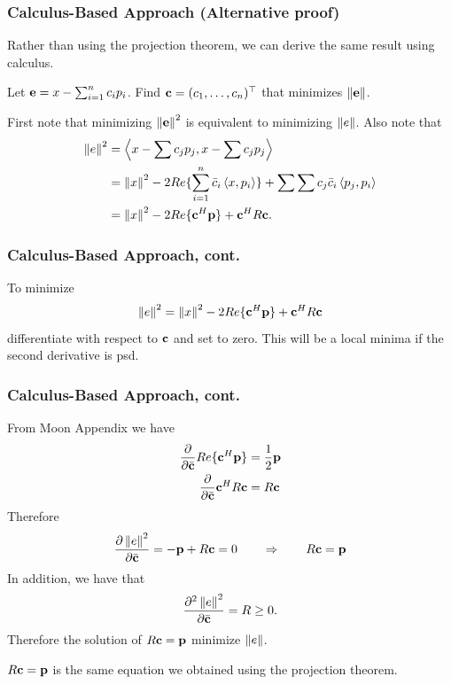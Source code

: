 \documentclass{beamer}
\begin{document}
\begin{frame}\frametitle{Calculus-Based Approach (Alternative proof)}
	Rather than using the projection theorem, we can derive the same result using calculus.
	
	\vfill
	
	\par{}
	Let $\mathbf{e} = x - \sum_{i=1}^n c_i p_i$.  Find $\mathbf{c}=(c_1, \dots, c_n)^\top$ that minimizes $\left\|\mathbf{e}\right\|$.
	
	\vfill
	
	\par{}
	First note that minimizing $\left\|\mathbf{e}\right\|^2$ is equivalent to minimizing $\left\|e\right\|$.
	Also note that 
	\begin{align*}
	\left\|e\right\|^2 &= \left< x - \sum c_jp_j, x - \sum c_j p_j\right>\\
		&= \left\|x\right\|^2 - 2 Re\{ \sum_{i=1}^n \bar{c}_i\left<
			x,p_i\right>\} + \sum \sum c_j \bar{c}_i \left< p_j, p_i\right>	 \\
		&= \left\|x\right\|^2 - 2 Re\{ \mathbf{c}^H\mathbf{p} \} +\mathbf{c}^H R \mathbf{c}.
	\end{align*}
	
\end{frame}

\begin{frame}\frametitle{Calculus-Based Approach, cont.}

	To minimize 
	\[
	\left\|e\right\|^2 = \left\|x\right\|^2 - 2 Re\{ \mathbf{c}^H\mathbf{p} \} +\mathbf{c}^H R \mathbf{c}
	\]
	differentiate with respect to $\mathbf{c}$ and set to zero.  This
	will be a local minima if the second derivative is psd.
\end{frame}

\begin{frame}\frametitle{Calculus-Based Approach, cont.}
	From Moon Appendix we have
	\begin{align*}
	\frac{\partial}{\partial \bar{\mathbf{c}}} Re\{\mathbf{c}^H \mathbf{p}\} &= \frac{1}{2}\mathbf{p} \\
	\frac{\partial}{\partial \bar{\mathbf{c}}} \mathbf{c}^H R \mathbf{c} &= R\mathbf{c}
	\end{align*}
	Therefore
	\[ 
	\frac{\partial \left\|e\right\|^2}{\partial \bar{\mathbf{c}}} = -\mathbf{p} + 
	R \mathbf{c} = 0 \qquad \Rightarrow \qquad R \mathbf{c} = \mathbf{p} 
	\]
	In addition, we have that
	\[ 
	\frac{\partial^2 \left\|e\right\|^2}{\partial \bar{\mathbf{c}}} = R \geq 0.
	\]
	Therefore the solution of $R\mathbf{c}=\mathbf{p}$ minimize $\left\|e\right\|$.
	
	$R\mathbf{c} = \mathbf{p}$ is the same equation we obtained using the
	projection theorem.
	
\end{frame}
\end{document}
